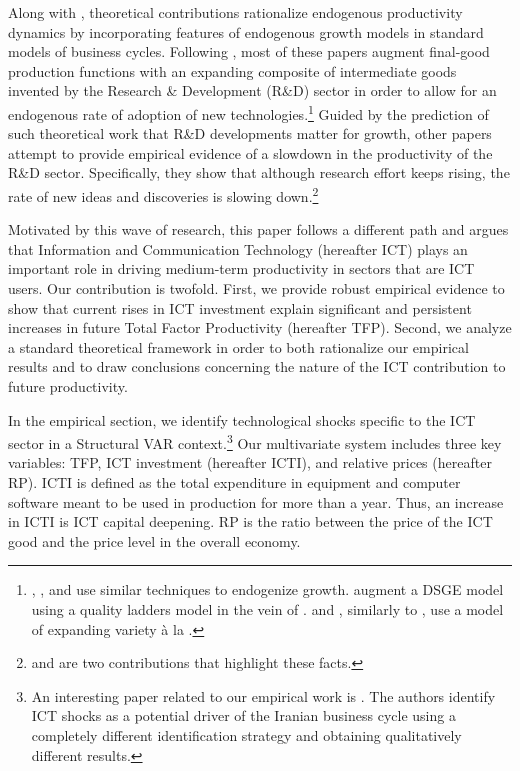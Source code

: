 \documentclass[12pt]{article}
\begin{document}
Along with \cite{comin2006medium}, theoretical contributions rationalize endogenous productivity dynamics by incorporating features of endogenous growth models in standard models of business cycles. Following \cite{romer1990endogenous}, most of these papers augment final-good production functions with an expanding composite of intermediate goods invented by the Research \& Development (R\&D) sector in order to allow for an endogenous rate of adoption of new technologies.\footnote{\cite{bianchi2014growth}, \cite{anzoategui2016endogenous}, and \cite{moran2017innovation} use similar techniques to endogenize growth. \cite{bianchi2014growth} augment a DSGE  model using a quality ladders model in the vein of \cite{grossman1991quality}. \cite{anzoategui2016endogenous} and \cite{moran2017innovation}, similarly to \cite{comin2006medium}, use a model of expanding variety \`a la \cite{romer1990endogenous}.} Guided by the prediction of such theoretical work that R\&D developments matter for growth, other papers attempt to provide empirical evidence of a slowdown in the productivity of the R\&D sector. Specifically, they show that although research effort keeps rising, the rate of new ideas and discoveries is slowing down.\footnote{\cite{jones2009burden} and \cite{bloom2017ideas} are two contributions that highlight these facts.}

Motivated by this wave of research, this paper follows a different path and argues that Information and Communication Technology (hereafter ICT) plays an important role in driving medium-term productivity in sectors that are ICT users. Our contribution is twofold. First, we provide robust empirical evidence to show that current rises in ICT investment explain significant and persistent increases in future Total Factor Productivity (hereafter TFP). Second, we analyze a standard theoretical framework in order to both rationalize our empirical results and to draw conclusions concerning the nature of the ICT contribution to future productivity. 

In the empirical section, we identify technological shocks specific to the ICT sector in a Structural VAR context.\footnote{An interesting paper related to our empirical work is \cite{jafari2012impact}. The authors identify ICT shocks as a potential driver of the Iranian business cycle using a completely different identification strategy and obtaining qualitatively different results.} Our multivariate system includes three key variables: TFP, ICT investment (hereafter ICTI), and relative prices (hereafter RP). ICTI is defined as the total expenditure in equipment and computer software meant to be used in production for more than a year. Thus, an increase in ICTI is ICT capital deepening. RP is the ratio between the price of the ICT good and the price level in the overall economy. 
\end{document}
